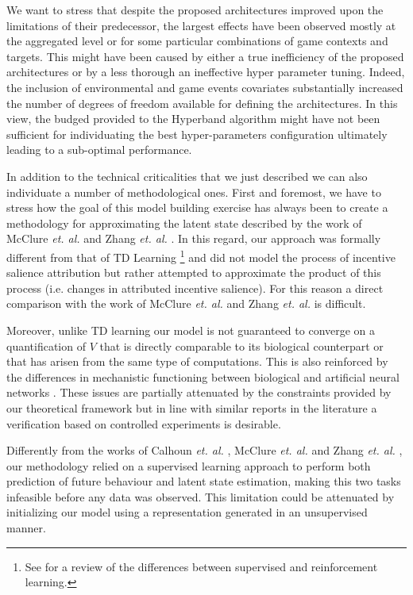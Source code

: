 We want to stress that despite the proposed architectures improved upon the limitations of their predecessor, the largest effects have been observed mostly at the aggregated level or for some particular combinations of game contexts and targets. This might have been caused by either a true inefficiency of the proposed architectures or by a less thorough an ineffective hyper parameter tuning. Indeed, the inclusion of environmental and game events covariates substantially increased the number of degrees of freedom available for defining the architectures. In this view, the budged provided to the Hyperband algorithm might have not been sufficient for individuating the best hyper-parameters configuration ultimately leading to a sub-optimal performance. 

In addition to the technical criticalities that we just described we can also individuate a number of methodological ones. First and foremost, we have to stress how the goal of this model building exercise has always been to create a methodology for approximating the latent state described by the work of McClure \textit{et. al.} \cite{mcclure2003computational} and Zhang \textit{et. al.} \cite{zhang2009neural}. In this regard, our approach was formally different from that of TD Learning \footnote{See \cite{barto2004reinforcement} for a  review of the differences between supervised and reinforcement learning.} and did not model the process of incentive salience attribution but rather attempted to approximate the product of this process (i.e. changes in attributed incentive salience). For this reason a direct comparison with the work of McClure \textit{et. al.} \cite{mcclure2003computational} and Zhang \textit{et. al.} \cite{zhang2009neural} is difficult. 

Moreover, unlike TD learning \cite{schultz1997neural} our model is not guaranteed to converge on a quantification of $V$ that is directly comparable to its biological counterpart or that has arisen from the same type of computations. This is also reinforced by the differences in mechanistic functioning between biological and artificial neural networks \cite{lillicrap2019backpropagation,lillicrap2020backpropagation}. These issues are partially attenuated by the constraints provided by our theoretical framework but in line with similar reports in the literature \cite{calhoun2019unsupervised,wang2018prefrontal} a verification based on controlled experiments is desirable. 

Differently from the works of Calhoun \textit{et. al.} \cite{calhoun2019unsupervised},  McClure \textit{et. al.} \cite{mcclure2003computational} and Zhang \textit{et. al.} \cite{zhang2009neural}, our methodology relied on a  supervised learning approach to perform both prediction of future behaviour and latent state estimation, making this two tasks infeasible before any data was observed. This limitation could be attenuated by initializing our model using a representation  generated in an unsupervised manner. 

